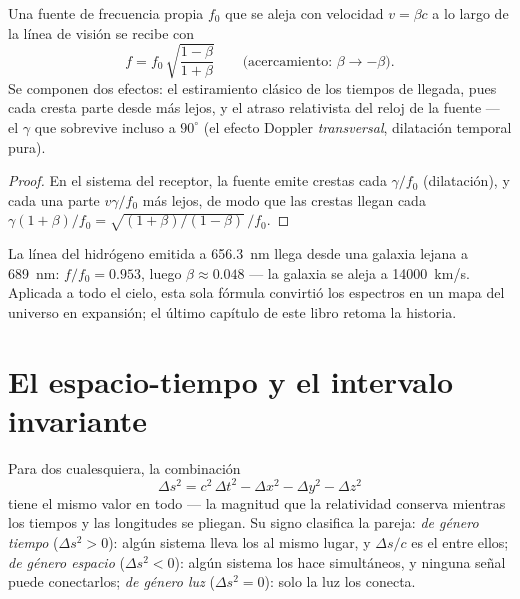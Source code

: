 \begin{proposition}\label{prop:b3:relativistic-kinematics:doppler}
Una fuente de frecuencia propia $f_0$ que se aleja con velocidad
$v = \beta c$ a lo largo de la línea de visión se recibe con
\[
f = f_0\,\sqrt{\frac{1 - \beta}{1 + \beta}}
\qquad
\text{(acercamiento: } \beta \to -\beta\text{)} .
\]
Se componen dos efectos: el estiramiento clásico de los tiempos de llegada,
pues cada cresta parte desde más lejos, y el atraso relativista del reloj de
la fuente --- el $\gamma$ que sobrevive incluso a $90^\circ$ (el efecto
Doppler \emph{transversal}, dilatación temporal pura).
\end{proposition}

\begin{proof}
En el sistema del receptor, la fuente emite crestas cada
$\gamma/f_0$ (dilatación), y cada una parte $v\gamma/f_0$ más lejos, de modo
que las crestas llegan cada $\gamma(1 + \beta)/f_0 = \sqrt{(1+\beta)/
(1-\beta)}\,/f_0$.
\end{proof}

\begin{example}\label{ex:b3:relativistic-kinematics:redshift}
La línea del hidrógeno emitida a \qty{656.3}{nm} llega desde una galaxia
lejana a \qty{689}{nm}: $f/f_0 = 0.953$, luego $\beta \approx 0.048$ ---
la galaxia se aleja a \qty{14000}{km/s}. Aplicada a todo el cielo, esta
sola fórmula convirtió los espectros en un mapa del universo en expansión;
el último capítulo de este libro retoma la historia.
\end{example}

\section{El espacio-tiempo y el intervalo invariante}

\begin{theorem}\label{thm:b3:relativistic-kinematics:interval}
Para dos  cualesquiera, la combinación
\[
\Delta s^2 = c^2\,\Delta t^2 - \Delta x^2 - \Delta y^2 - \Delta z^2
\]
tiene el mismo valor en todo  --- la magnitud que la
relatividad conserva mientras los tiempos y las longitudes se pliegan. Su
signo clasifica la pareja: \emph{de género tiempo} ($\Delta s^2 > 0$): algún
sistema lleva los  al mismo lugar, y $\Delta s/c$ es el 
entre ellos; \emph{de género espacio} ($\Delta s^2 < 0$): algún sistema los
hace simultáneos, y ninguna señal puede conectarlos; \emph{de género luz}
($\Delta s^2 = 0$): solo la luz los conecta.
\end{theorem}

